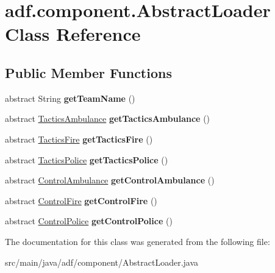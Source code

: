 \hypertarget{classadf_1_1component_1_1AbstractLoader}{}\section{adf.\+component.\+Abstract\+Loader Class Reference}
\label{classadf_1_1component_1_1AbstractLoader}
\subsection*{Public Member Functions}
\begin{DoxyCompactItemize}
\item 
\hypertarget{classadf_1_1component_1_1AbstractLoader_a295d96c63465aa594b5b8a8137cbfd96}{}\label{classadf_1_1component_1_1AbstractLoader_a295d96c63465aa594b5b8a8137cbfd96} 
abstract String {\bfseries get\+Team\+Name} ()
\item 
\hypertarget{classadf_1_1component_1_1AbstractLoader_aa51ed4518181e2fb4ecc2ede1a37c095}{}\label{classadf_1_1component_1_1AbstractLoader_aa51ed4518181e2fb4ecc2ede1a37c095} 
abstract \hyperlink{classadf_1_1component_1_1tactics_1_1TacticsAmbulance}{Tactics\+Ambulance} {\bfseries get\+Tactics\+Ambulance} ()
\item 
\hypertarget{classadf_1_1component_1_1AbstractLoader_a65bd38d51297afe669f520a06a8370a5}{}\label{classadf_1_1component_1_1AbstractLoader_a65bd38d51297afe669f520a06a8370a5} 
abstract \hyperlink{classadf_1_1component_1_1tactics_1_1TacticsFire}{Tactics\+Fire} {\bfseries get\+Tactics\+Fire} ()
\item 
\hypertarget{classadf_1_1component_1_1AbstractLoader_a3d3610a866da0281a666f89ffff97e81}{}\label{classadf_1_1component_1_1AbstractLoader_a3d3610a866da0281a666f89ffff97e81} 
abstract \hyperlink{classadf_1_1component_1_1tactics_1_1TacticsPolice}{Tactics\+Police} {\bfseries get\+Tactics\+Police} ()
\item 
\hypertarget{classadf_1_1component_1_1AbstractLoader_ae0e863e62dd52b91bb7c4f7aef2352aa}{}\label{classadf_1_1component_1_1AbstractLoader_ae0e863e62dd52b91bb7c4f7aef2352aa} 
abstract \hyperlink{classadf_1_1component_1_1control_1_1ControlAmbulance}{Control\+Ambulance} {\bfseries get\+Control\+Ambulance} ()
\item 
\hypertarget{classadf_1_1component_1_1AbstractLoader_a74108335029b07d140ea618a899fbe24}{}\label{classadf_1_1component_1_1AbstractLoader_a74108335029b07d140ea618a899fbe24} 
abstract \hyperlink{classadf_1_1component_1_1control_1_1ControlFire}{Control\+Fire} {\bfseries get\+Control\+Fire} ()
\item 
\hypertarget{classadf_1_1component_1_1AbstractLoader_a7b063a5b8721c74ae633a8ff5c7f1bd3}{}\label{classadf_1_1component_1_1AbstractLoader_a7b063a5b8721c74ae633a8ff5c7f1bd3} 
abstract \hyperlink{classadf_1_1component_1_1control_1_1ControlPolice}{Control\+Police} {\bfseries get\+Control\+Police} ()
\end{DoxyCompactItemize}


The documentation for this class was generated from the following file\+:\begin{DoxyCompactItemize}
\item 
src/main/java/adf/component/Abstract\+Loader.\+java\end{DoxyCompactItemize}
